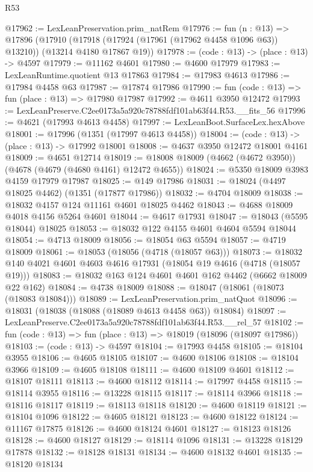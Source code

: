 \begin{lexlean}{R53}
\begin{coremodule}
@17962 := LexLeanPreservation.prim_natRem
@17976 := fun (n : @13) =>
  @17896
    (@17910 (@17918 (@17924 (@17961 (@17962 @4458 @1096 @63)) @13210)) (@13214 @4180 @17867 @19))
@17978 := (code : @13) -> (place : @13) -> @4597
@17979 := @11162 @4601
@17980 := @4600 @17979
@17983 := LexLeanRuntime.quotient @13 @17863
@17984 := @17983 @4613
@17986 := @17984 @4458 @63
@17987 := @17874 @17986
@17990 := fun (code : @13) => fun (place : @13) => @17980 @17987
@17992 := @4611 @3950 @12472
@17993 := LexLeanPreserve.C2ee0173a5a920c78788fdf101ab63f44.R53.__fits_56
@17996 := @4621 (@17993 @4613 @4458)
@17997 := LexLeanBoot.SurfaceLex.hexAbove
@18001 := @17996 (@1351 (@17997 @4613 @4458))
@18004 := (code : @13) -> (place : @13) -> @17992 @18001
@18008 := @4637 @3950 @12472 @18001 @4161
@18009 := @4651 @12714
@18019 := @18008 @18009 (@4662 (@4672 @3950)) (@4678 (@4679 (@4680 @4161) @12472 @4655))
@18024 := @5350 @18009 @3983 @4159 @17979 @17987
@18025 := @149 @17986
@18031 := @18024 (@4497 @18025 @4462) (@1351 (@17877 @17986))
@18032 := @4704 @18009
@18038 := @18032 @4157 @124 @11161 @4601 @18025 @4462
@18043 := @4688 @18009 @4018 @4156 @5264 @4601
@18044 := @4617 @17931
@18047 := @18043 (@5595 @18044) @18025
@18053 := @18032 @122 @4155 @4601 @4604 @5594 @18044
@18054 := @4713 @18009
@18056 := @18054 @63 @5594
@18057 := @4719 @18009
@18061 := @18053 (@18056 (@4718 (@18057 @63)))
@18073 := @18032 @140 @4021 @4601 @4603 @4616 @17931 (@18054 @19 @4616 (@4718 (@18057 @19)))
@18083 := @18032 @163 @124 @4601 @4601 @162 @4462 (@6662 @18009 @22 @162)
@18084 := @4738 @18009
@18088 := @18047 (@18061 (@18073 (@18083 @18084)))
@18089 := LexLeanPreservation.prim_natQuot
@18096 := @18031 (@18038 (@18088 (@18089 @4613 @4458 @63)) @18084)
@18097 := LexLeanPreserve.C2ee0173a5a920c78788fdf101ab63f44.R53.__rel_57
@18102 := fun (code : @13) => fun (place : @13) => @18019 (@18096 (@18097 @17986))
@18103 := (code : @13) -> @4597
@18104 := @17993 @4458
@18105 := @18104 @3955
@18106 := @4605 @18105
@18107 := @4600 @18106
@18108 := @18104 @3966
@18109 := @4605 @18108
@18111 := @4600 @18109 @4601
@18112 := @18107 @18111
@18113 := @4600 @18112
@18114 := @17997 @4458
@18115 := @18114 @3955
@18116 := @13228 @18115
@18117 := @18114 @3966
@18118 := @18116 @18117
@18119 := @18113 @18118
@18120 := @4600 @18119
@18121 := @18104 @1096
@18122 := @4605 @18121
@18123 := @4600 @18122
@18124 := @11167 @17875
@18126 := @4600 @18124 @4601
@18127 := @18123 @18126
@18128 := @4600 @18127
@18129 := @18114 @1096
@18131 := @13228 @18129 @17878
@18132 := @18128 @18131
@18134 := @4600 @18132 @4601
@18135 := @18120 @18134

\end{coremodule}
\end{lexlean}
